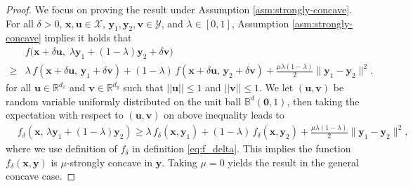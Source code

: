 \documentclass[11pt]{article}
\def\vzero{\mathbf{0}}
\def\vu{\mathbf{u}}
\def\vv{\mathbf{v}}
\def\vx{\mathbf{x}}
\def\vy{\mathbf{y}}
\def\fX{{\mathcal{X}}}
\def\fY{{\mathcal{Y}}}
\def\BB{{\mathbb{B}}}
\def\BR{{\mathbb{R}}}
\begin{document}
\begin{proof}
We focus on proving the result under Assumption \ref{asm:strongly-concave}.
For all $\delta>0$, $\vx,\vu\in\fX$, $\vy_1,\vy_2,\vv\in\fY$, and $\lambda\in[0,1]$,  Assumption \ref{asm:strongly-concave} implies it holds that
\begin{align*}
& f\big(\vx+\delta \vu,\; \lambda \vy_1 + (1-\lambda)\vy_2 + \delta \vv\big) \\
\ge & \lambda\, f(\vx+\delta \vu,\, \vy_1 + \delta \vv)
+ (1-\lambda)\, f(\vx+\delta \vu,\, \vy_2 + \delta \vv)
+ \frac{\mu\lambda(1-\lambda)}{2}\|\vy_1 - \vy_2\|^2.
\end{align*}
for all $\vu\in\BR^{d_x}$ and $\vv\in\BR^{d_y}$ such that $||\vu||\leq 1$ and $||\vv||\leq 1$.
We let $(\vu,\vv)$ be random variable uniformly distributed on the unit ball $\BB^{d}(\vzero,1)$, then taking the expectation with respect to $(\vu,\vv)$ on above inequality leads to 
\begin{align*}
& f_\delta(\vx,\, \lambda \vy_1 + (1-\lambda)\vy_2) 
\ge 
\lambda\, f_\delta(\vx, \vy_1)
+ (1-\lambda)\, f_\delta(\vx, \vy_2)
+ \frac{\mu\lambda(1-\lambda)}{2}\|\vy_1 - \vy_2\|^2,
\end{align*}
where we use definition of $f_\delta$ in definition \eqref{eq:f_delta}.
This implies the function $f_\delta(\vx,\vy)$ is $\mu$-strongly concave in $\vy$.  
Taking $\mu=0$ yields the result in the general concave case.
\end{proof}
\end{document}
